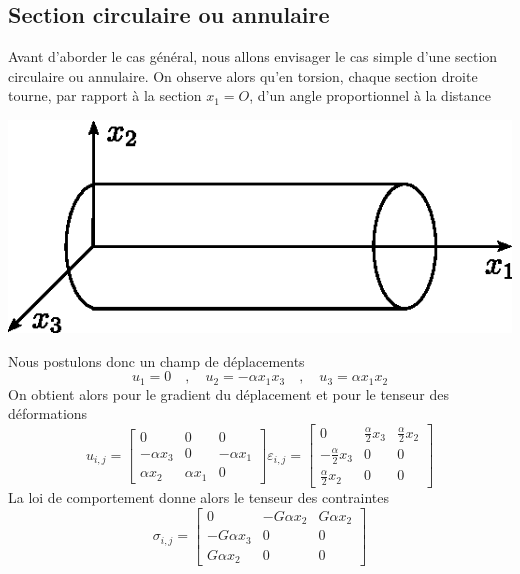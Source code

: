 \subsection{Section circulaire ou annulaire}
Avant d'aborder le cas général, nous allons envisager le cas simple d'une section circulaire ou annulaire.
On ohserve alors qu'en torsion, chaque section droite tourne, par rapport à la section $x_1=O$, d'un angle proportionnel à la distance
\begin{center}
    \includegraphics{../images/T1_Ch07-09}
\end{center}
Nous postulons donc un champ de déplacements
\begin{equation}
    u_1 = 0 \quad,\quad u_2 = -\alpha x_1 x_3 \quad,\quad u_3 = \alpha x_1 x_2
    \label{eq:Ch07-037}
\end{equation}
On obtient alors pour le gradient du déplacement et pour le tenseur des déformations
\begin{equation}
    u_{i,j} = 
    \begin{bmatrix}
        0 & 0 & 0 \\
        -\alpha x_3 & 0 & -\alpha x_1 \\
        \alpha x_2 & \alpha x_1 & 0
    \end{bmatrix}
    \varepsilon_{i,j} = 
    \begin{bmatrix}
        0 & \frac{\alpha}{2}x_3 & \frac{\alpha}{2}x_2 \\
        -\frac{\alpha}{2}x_3 & 0 & 0 \\
        \frac{\alpha}{2}x_2 & 0 & 0
    \end{bmatrix}
    \label{eq:Ch07-038}
\end{equation}
La loi de comportement donne alors le tenseur des contraintes
\begin{equation}
    \sigma_{i,j} = 
    \begin{bmatrix}
        0 & -G\alpha x_2 & G\alpha x_2 \\
        -G \alpha x_3 & 0 & 0 \\
        G \alpha x_2 & 0 & 0
    \end{bmatrix}
    \label{eq:Ch07-039}
\end{equation}
